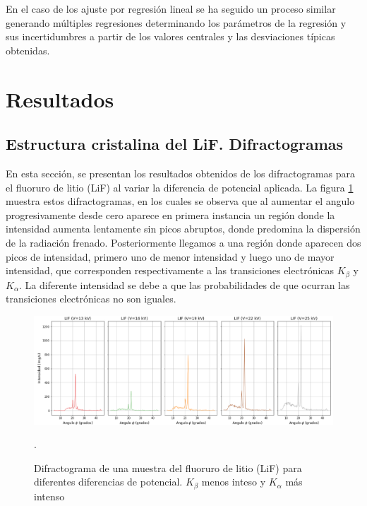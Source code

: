 En el caso de los ajuste por regresión lineal se ha seguido un proceso similar generando múltiples regresiones determinando los parámetros de la regresión y sus incertidumbres a partir de los valores centrales y las desviaciones típicas obtenidas.



\section{Resultados}

\subsection{Estructura cristalina del LiF. Difractogramas}


En esta sección, se presentan los resultados obtenidos de los difractogramas para el fluoruro de litio (LiF) al variar la diferencia de potencial aplicada. La figura \ref{fig:difractogramas_LiF} muestra estos difractogramas, en los cuales se observa que al aumentar el angulo progresivamente desde cero aparece en primera instancia un región donde la intensidad aumenta lentamente sin picos abruptos, donde predomina la dispersión de la radiación frenado. Posteriormente llegamos a una región donde aparecen  dos picos de intensidad, primero uno de menor intensidad y luego uno de mayor intensidad, que corresponden respectivamente a las transiciones electrónicas $K_{\beta}$ y $K_{\alpha}$. La diferente intensidad se debe a que las probabilidades de que ocurran las transiciones electrónicas no son iguales.

\begin{figure}[H]
	\centering
	\begin{minipage}{0.9\textwidth} 
		\includegraphics[width=\textwidth]{grafico_2x02_difractogramas_LiF.png}
		\caption{\footnotesize Difractograma de una muestra del fluoruro de litio (LiF) para diferentes diferencias de potencial.  $K_{\beta}$ menos inteso y $K_{\alpha}$ más intenso}.
		\label{fig:difractogramas_LiF}
	\end{minipage}
\end{figure}


